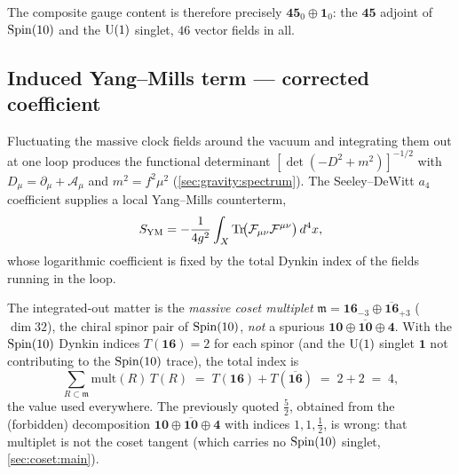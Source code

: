 The composite gauge content is therefore precisely $\mathbf{45}_{0}\oplus\mathbf 1_{0}$:
the $\mathbf{45}$ adjoint of $\operatorname{Spin}(10)$ and the $\mathrm{U}(1)$ singlet,
$46$ vector fields in all.

\subsection{Induced Yang--Mills term --- corrected coefficient}
\label{sec:gauge:YM}

Fluctuating the massive clock fields around the vacuum and integrating
them out at one loop produces the functional determinant
$[\det(-D^{2}+m^{2})]^{-1/2}$ with $D_\mu=\partial_\mu+\mathcal A_\mu$ and
$m^{2}=f^{2}\mu^{2}$ (\autoref{sec:gravity:spectrum}). The Seeley--DeWitt
$a_4$ coefficient supplies a local Yang--Mills counterterm,
\begin{equation}\label{eq:gauge:YM}
  S_{\text{YM}}
  = -\frac{1}{4g^{2}}\int_{X}\operatorname{Tr}\!\bigl(\mathcal F_{\mu\nu}\mathcal F^{\mu\nu}\bigr)\,d^{4}x,
\end{equation}
whose logarithmic coefficient is fixed by the total Dynkin index of the
fields running in the loop.

\begin{remark}
\label{rem:gauge:correctedindex}
The integrated-out matter is the \emph{massive coset multiplet}
$\mathfrak m=\mathbf{16}_{-3}\oplus\overline{\mathbf{16}}_{+3}$
($\dim 32$), the chiral spinor pair of $\operatorname{Spin}(10)$, \emph{not} a
spurious $\mathbf{10}\oplus\overline{\mathbf{10}}\oplus\mathbf 4$.
With the $\operatorname{Spin}(10)$ Dynkin indices $T(\mathbf{16})=2$ for each spinor
(and the $\mathrm{U}(1)$ singlet $\mathbf 1$ not contributing to the
$\operatorname{Spin}(10)$ trace), the total index is
\begin{equation}\label{eq:gauge:totalindex}
  \sum_{R\subset\mathfrak m}\mathrm{mult}(R)\,T(R)
  \;=\; T(\mathbf{16})+T(\overline{\mathbf{16}})
  \;=\; 2+2 \;=\; 4,
\end{equation}
the value used everywhere. The previously quoted $\tfrac52$, obtained
from the (forbidden) decomposition $\mathbf{10}\oplus\overline{\mathbf{10}}\oplus\mathbf 4$
with indices $1,1,\tfrac12$, is wrong: that multiplet is not the coset
tangent (which carries no $\operatorname{Spin}(10)$ singlet, \autoref{sec:coset:main}).
\end{remark}

